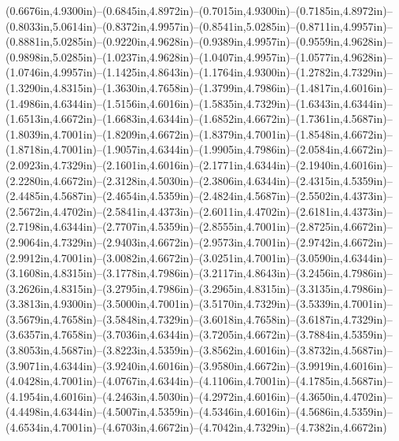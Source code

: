 (0.6676in,4.9300in)--(0.6845in,4.8972in)--(0.7015in,4.9300in)--(0.7185in,4.8972in)--(0.8033in,5.0614in)--(0.8372in,4.9957in)--(0.8541in,5.0285in)--(0.8711in,4.9957in)--(0.8881in,5.0285in)--(0.9220in,4.9628in)--(0.9389in,4.9957in)--(0.9559in,4.9628in)--(0.9898in,5.0285in)--(1.0237in,4.9628in)--(1.0407in,4.9957in)--(1.0577in,4.9628in)--(1.0746in,4.9957in)--(1.1425in,4.8643in)--(1.1764in,4.9300in)--(1.2782in,4.7329in)--(1.3290in,4.8315in)--(1.3630in,4.7658in)--(1.3799in,4.7986in)--(1.4817in,4.6016in)--(1.4986in,4.6344in)--(1.5156in,4.6016in)--(1.5835in,4.7329in)--(1.6343in,4.6344in)--(1.6513in,4.6672in)--(1.6683in,4.6344in)--(1.6852in,4.6672in)--(1.7361in,4.5687in)--(1.8039in,4.7001in)--(1.8209in,4.6672in)--(1.8379in,4.7001in)--(1.8548in,4.6672in)--(1.8718in,4.7001in)--(1.9057in,4.6344in)--(1.9905in,4.7986in)--(2.0584in,4.6672in)--(2.0923in,4.7329in)--(2.1601in,4.6016in)--(2.1771in,4.6344in)--(2.1940in,4.6016in)--(2.2280in,4.6672in)--(2.3128in,4.5030in)--(2.3806in,4.6344in)--(2.4315in,4.5359in)--(2.4485in,4.5687in)--(2.4654in,4.5359in)--(2.4824in,4.5687in)--(2.5502in,4.4373in)--(2.5672in,4.4702in)--(2.5841in,4.4373in)--(2.6011in,4.4702in)--(2.6181in,4.4373in)--(2.7198in,4.6344in)--(2.7707in,4.5359in)--(2.8555in,4.7001in)--(2.8725in,4.6672in)--(2.9064in,4.7329in)--(2.9403in,4.6672in)--(2.9573in,4.7001in)--(2.9742in,4.6672in)--(2.9912in,4.7001in)--(3.0082in,4.6672in)--(3.0251in,4.7001in)--(3.0590in,4.6344in)--(3.1608in,4.8315in)--(3.1778in,4.7986in)--(3.2117in,4.8643in)--(3.2456in,4.7986in)--(3.2626in,4.8315in)--(3.2795in,4.7986in)--(3.2965in,4.8315in)--(3.3135in,4.7986in)--(3.3813in,4.9300in)--(3.5000in,4.7001in)--(3.5170in,4.7329in)--(3.5339in,4.7001in)--(3.5679in,4.7658in)--(3.5848in,4.7329in)--(3.6018in,4.7658in)--(3.6187in,4.7329in)--(3.6357in,4.7658in)--(3.7036in,4.6344in)--(3.7205in,4.6672in)--(3.7884in,4.5359in)--(3.8053in,4.5687in)--(3.8223in,4.5359in)--(3.8562in,4.6016in)--(3.8732in,4.5687in)--(3.9071in,4.6344in)--(3.9240in,4.6016in)--(3.9580in,4.6672in)--(3.9919in,4.6016in)--(4.0428in,4.7001in)--(4.0767in,4.6344in)--(4.1106in,4.7001in)--(4.1785in,4.5687in)--(4.1954in,4.6016in)--(4.2463in,4.5030in)--(4.2972in,4.6016in)--(4.3650in,4.4702in)--(4.4498in,4.6344in)--(4.5007in,4.5359in)--(4.5346in,4.6016in)--(4.5686in,4.5359in)--(4.6534in,4.7001in)--(4.6703in,4.6672in)--(4.7042in,4.7329in)--(4.7382in,4.6672in) 